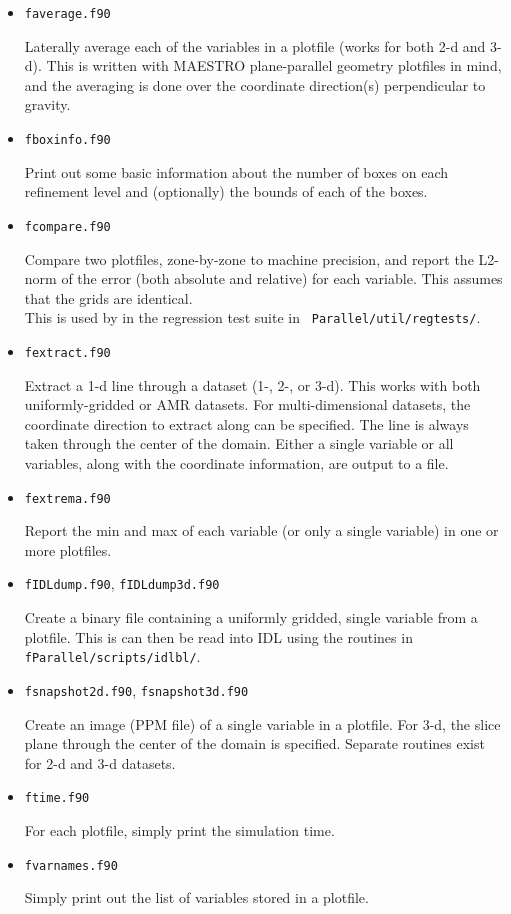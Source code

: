 \begin{itemize}

\item {\tt faverage.f90}

  Laterally average each of the variables in a plotfile (works for
  both 2-d and 3-d).  This is written with MAESTRO
  plane-parallel geometry plotfiles in mind, and the averaging is done
  over the coordinate direction(s) perpendicular to gravity.


\item {\tt fboxinfo.f90}

  Print out some basic information about the number of boxes on each
  refinement level and (optionally) the bounds of each of the boxes.

\item {\tt fcompare.f90}

  Compare two plotfiles, zone-by-zone to machine precision, and report
  the L2-norm of the error (both absolute and relative) for each
  variable.  This assumes that the grids are identical. \\[-3mm]

  This is used by in the regression test suite in {\tt
  Parallel/util/regtests/}.


\item {\tt fextract.f90}

  Extract a 1-d line through a dataset (1-, 2-, or 3-d).  This works
  with both uniformly-gridded or AMR datasets.  For multi-dimensional
  datasets, the coordinate direction to extract along can be specified.
  The line is always taken through the center of the domain.  Either
  a single variable or all variables, along with the coordinate 
  information, are output to a file.
  

\item {\tt fextrema.f90}

  Report the min and max of each variable (or only a single variable)
  in one or more plotfiles.


\item {\tt fIDLdump.f90}, {\tt fIDLdump3d.f90}

  Create a binary file containing a uniformly gridded, single variable
  from a plotfile.  This is can then be read into IDL using the routines
  in {\tt fParallel/scripts/idlbl/}.


\item {\tt fsnapshot2d.f90}, {\tt fsnapshot3d.f90}

  Create an image (PPM file) of a single variable in a plotfile.  For
  3-d, the slice plane through the center of the domain is specified.
  Separate routines exist for 2-d and 3-d datasets.
  

\item {\tt ftime.f90}
 
  For each plotfile, simply print the simulation time.


\item {\tt fvarnames.f90}

  Simply print out the list of variables stored in a plotfile.


\end{itemize}


